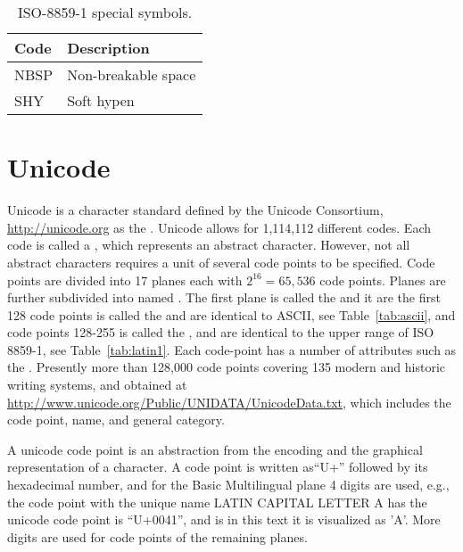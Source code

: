\begin{table}
  \centering
  \begin{tabular}{|l|l|}
    \hline
    Code & Description\\
    \hline
    NBSP & Non-breakable space\\
    SHY & Soft hypen\\
    \hline
  \end{tabular}
  \caption{ISO-8859-1 special symbols.}
  \label{tab:latin1SpecialSymbols}
\end{table}

\section{Unicode}
\label{sec:unicode}
Unicode is a character standard defined by the Unicode Consortium, \url{http://unicode.org} as the . Unicode allows for 1,114,112 different codes. Each code is called a , which represents an abstract character. However, not all abstract characters requires a unit of several code points to be specified. Code points are divided into 17 planes each with $2^{16}=65,536$ code points. Planes are further subdivided into named . The first plane is called the  and it are the first 128 code points is called the  and are identical to ASCII, see Table~\ref{tab:ascii}, and code points 128-255 is called the , and are identical to the upper range of ISO 8859-1, see Table~\ref{tab:latin1}.  Each code-point has a number of attributes such as the . Presently more than 128,000 code points covering 135 modern and historic writing systems, and obtained at \url{http://www.unicode.org/Public/UNIDATA/UnicodeData.txt}, which includes the code point, name, and general category.

A unicode code point is an abstraction from the encoding and the graphical representation of a character. A code point is written as``U+'' followed by its hexadecimal number, and for the Basic Multilingual plane 4 digits are used, e.g., the code point with the unique name LATIN CAPITAL LETTER A has the unicode code point is ``U+0041'', and is in this text it is visualized as 'A'. More digits are used for code points of the remaining planes.

